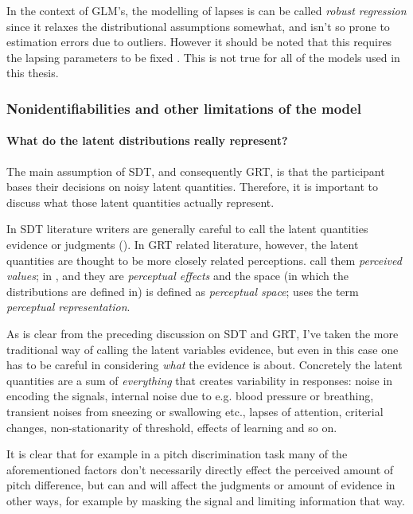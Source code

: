 \documentclass{article}\usepackage{knitr}
\begin{document}
In the context of GLM's, the modelling of lapses is can be called \textit{robust regression} \citep[p. 635]{kruschke2015} since it relaxes the distributional assumptions somewhat, and isn't so prone to estimation errors due to outliers. However it should be noted that this requires the lapsing parameters to be fixed \citep[p. ERROR]{skrondahl2004}. This is not true for all of the models used in this thesis.

\subsubsection{Nonidentifiabilities and other limitations of the model}

\paragraph{What do the latent distributions really represent?}

The main assumption of SDT, and consequently GRT, is that the participant bases their decisions on noisy latent quantities. Therefore, it is important to discuss what those latent quantities actually represent.  

In SDT literature writers are generally careful to call the latent quantities evidence \citep{wickens2002, verde2006} or judgments (\citealp[p. 247]{stigler2003}). In GRT related literature, however, the latent quantities are thought to be more closely related perceptions. \cite{ashby2015} call them \textit{perceived values}; in \cite{ashby1986},  \cite{kadlec1992} and \cite{silbert2009} they are \textit{perceptual effects} and the space (in which the distributions are defined in) is defined as \textit{perceptual space}; \cite{soto2017} uses the term \textit{perceptual representation}.

As is clear from the preceding discussion on SDT and GRT, I've taken the more traditional way of calling the latent variables evidence, but even in this case one has to be careful in considering \textit{what} the evidence is about. Concretely the latent quantities are a sum of \textit{everything} that creates variability in responses: noise in encoding the signals, internal noise due to e.g. blood pressure or breathing, transient noises from sneezing or swallowing etc., lapses of attention, criterial changes, non-stationarity of threshold, effects of learning and so on. 

It is clear that for example in a pitch discrimination task many of the aforementioned factors don't necessarily directly effect the perceived amount of pitch difference, but can and will affect the judgments or amount of evidence in other ways, for example by masking the signal and limiting information that way.
\end{document}

